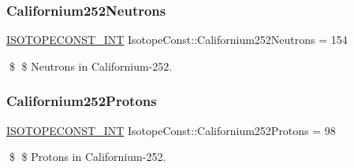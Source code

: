 \subsubsection{\texorpdfstring{Californium252\+Neutrons}{Californium252Neutrons}}
{\footnotesize\ttfamily \mbox{\hyperlink{group___isotope_const-_macros_ga5f18360b3e99483a35c32d789e62621c}{I\+S\+O\+T\+O\+P\+E\+C\+O\+N\+S\+T\+\_\+\+I\+NT}} Isotope\+Const\+::\+Californium252\+Neutrons = 154}

\$ \$ Neutrons in Californium-\/252. \mbox{\label{group___isotope_const-_californium-_cf252_gab8a4f1773a73e69f3089c1a1d7c77fc2}} 
\subsubsection{\texorpdfstring{Californium252\+Protons}{Californium252Protons}}
{\footnotesize\ttfamily \mbox{\hyperlink{group___isotope_const-_macros_ga5f18360b3e99483a35c32d789e62621c}{I\+S\+O\+T\+O\+P\+E\+C\+O\+N\+S\+T\+\_\+\+I\+NT}} Isotope\+Const\+::\+Californium252\+Protons = 98}

\$ \$ Protons in Californium-\/252. 